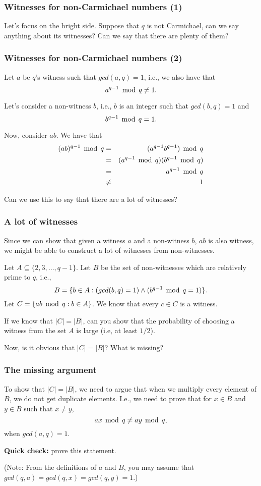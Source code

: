 \begin{frame}\frametitle{Witnesses for non-Carmichael numbers (1)}
  Let's focus on the bright side.  Suppose that $q$ is not Carmichael,
  can we say anything about its witnesses?  Can we say that there are
  plenty of them?
\end{frame}

\begin{frame}\frametitle{Witnesses for non-Carmichael numbers (2)}
  Let $a$ be $q$'s witness such that $gcd(a,q)=1$, i.e., we also have that
  \[ a^{q-1}\,\bmod\, q\neq 1. \]

  Let's consider a non-witness $b$, i.e., $b$ is an integer such that
  $gcd(b,q)=1$ and \[ b^{q-1}\,\bmod\, q=1. \]

  \pause
  Now, consider $ab$.  \pause We have that
  \begin{eqnarray*}
    (ab)^{q-1}\,\bmod\, q &=& (a^{q-1}b^{q-1})\,\bmod\, q \\
    &=& (a^{q-1}\,\bmod\, q)(b^{q-1}\,\bmod\, q)\\
    &=& a^{q-1}\,\bmod\, q\\
    &\neq& 1
  \end{eqnarray*}

  \pause Can we use this to say that there are a lot of witnesses?
\end{frame}

\begin{frame}\frametitle{A lot of witnesses}
  Since we can show that given a witness $a$ and a non-witness $b$,
  $ab$ is also witness, we might be able to construct a lot of
  witnesses from non-witnesses.  \pause
  
  Let $A\subseteq\{2,3,\ldots,q-1\}$.  Let $B$ be the set of
  non-witnesses which are relatively prime to $q$, i.e.,
  \[ B=\{b\in A : (gcd(b,q)=1) \wedge (b^{q-1}\,\bmod\, q = 1)\}. \]
  Let $C=\{ab\,\bmod\, q : b\in A \}$.  We know that every $c\in C$ is a witness.

  \pause If we know that $|C| = |B|$, can you show that the
  probability of choosing a witness from the set $A$ is large (i.e, at
  least $1/2$).

  \pause Now, is it obvious that $|C| = |B|$?  What is missing?
\end{frame}

\begin{frame}\frametitle{The missing argument}
  To show that $|C|=|B|$, we need to argue that when we multiply every
  element of $B$, we do not get duplicate elements.  I.e., we need to
  prove that for $x\in B$ and $y\in B$ such that $x\neq y$,
  \[ ax\,\bmod\, q \neq ay\,\bmod\, q,\]
  when $gcd(a,q)=1$.

  {\bf Quick check:} prove this statement.

  (Note: From the definitions of $a$ and $B$, you may assume that
  $gcd(q,a)=gcd(q,x)=gcd(q,y)=1$.)
\end{frame}

